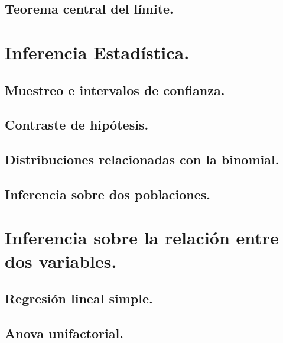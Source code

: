 \documentclass[10pt,a4paper]{book}
\begin{document}
\chapter{Teorema central del límite.}
\label{cap:TeoremaCentralLimite}



\part{Inferencia Estadística.}
\label{parte:InferenciaEstadistica}


\chapter{Muestreo e intervalos de confianza.}
\label{cap:IntervalosConfianza}


\chapter{Contraste de hipótesis.}
\label{cap:ContrasteHipotesis}



\chapter{Distribuciones relacionadas con la binomial.}
\label{cap:DistribucionesRelacionadasBinomial}


\chapter{Inferencia sobre dos poblaciones.}
\label{cap:Inferencia2Poblaciones}



\part{Inferencia sobre la relación entre dos variables.}
\label{parte:InferenciaRelacion2Variables}


\chapter{Regresión lineal simple.}
\label{cap:RegresionLinealSimple}


\chapter{Anova unifactorial.}
\label{cap:IntroduccionAnova}

\end{document}
